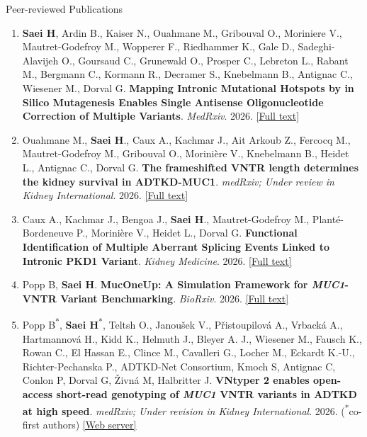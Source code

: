 \documentclass[
	11pt, %
]{resume} %
\begin{document}
\begin{rSection}{Peer-reviewed Publications}

\begin{enumerate}
  \item  \textbf{Saei H}, Ardin B., Kaiser N., Ouahmane M., Gribouval O., Moriniere V., Mautret-Godefroy M.,  Wopperer F.,  Riedhammer K., Gale D., Sadeghi-Alavijeh O., Goursaud C., Grunewald O., Prosper C., Lebreton L., Rabant M., Bergmann C., Kormann R., Decramer S., Knebelmann B., Antignac C.,  Wiesener M., Dorval G.
  \textbf{Mapping Intronic Mutational Hotspots by in Silico Mutagenesis Enables Single Antisense Oligonucleotide Correction of Multiple Variants}. 
  \textit{MedRxiv}. 2026. \href{https://www.medrxiv.org/content/10.64898/2026.09.10.26362533v1}{[Full text]}

  \item  Ouahmane M., \textbf{Saei H}., Caux A., Kachmar J., Ait Arkoub Z., Fercocq M., Mautret-Godefroy M., Gribouval O., Morinière V., Knebelmann B., Heidet L., Antignac C., Dorval G.
  \textbf{The frameshifted VNTR length determines the kidney survival in ADTKD-MUC1}.
  \textit{medRxiv; Under review in Kidney International}. 2026. \href{https://www.medrxiv.org/content/10.64898/2026.10.28.26365901v1}{[Full text]}

  \item  Caux A., Kachmar J., Bengoa J., \textbf{Saei H}., Mautret-Godefroy M., Planté-Bordeneuve P., Morinière V.,  Heidet L., Dorval G.
  \textbf{Functional Identification of Multiple Aberrant Splicing Events Linked to Intronic PKD1 Variant}. 
  \textit{Kidney Medicine}. 2026. \href{https://www.kidneymedicinejournal.org/article/S2590-0595(26)00311-0/fulltext}{[Full text]}

  \item  Popp B, \textbf{Saei H}.
  \textbf{MucOneUp: A Simulation Framework for \textit{MUC1}-VNTR Variant Benchmarking}. 
  \textit{BioRxiv}. 2026. \href{https://www.biorxiv.org/content/10.64898/2026.05.08.723876v1}{[Full text]}

  \item Popp B\textsuperscript{*}, \textbf{Saei H}\textsuperscript{*}, Teltsh O., Janoušek V., Přistoupilová A., Vrbacká A., Hartmannová H., Kidd K., Helmuth J., Bleyer A. J., Wiesener M., Fausch K., Rowan C., El Hassan E., Clince M., Cavalleri G., Locher M., Eckardt K.-U., Richter-Pechanska P., ADTKD-Net Consortium, Kmoch S, Antignac C, Conlon P, Dorval G, Živná M, Halbritter J.
  \textbf{VNtyper 2 enables open-access short-read genotyping of \textit{MUC1} VNTR variants in ADTKD at high speed}.  
  \textit{medRxiv; Under revision in Kidney International}. 2026. (\textsuperscript{*}co-first authors) \href{https://vntyper.org/}{[Web server]}
  

\end{enumerate}
\end{rSection}
\end{document}
